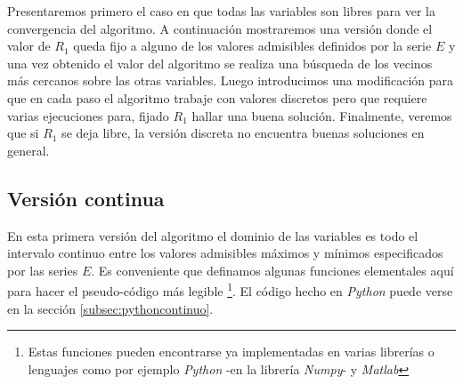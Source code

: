 \documentclass{llncs}
\begin{document}
	Presentaremos primero el caso en que todas las variables son libres para ver la convergencia del algoritmo. 
	A continuación mostraremos una versión donde el valor de $R_1$ queda fijo a alguno de los valores admisibles
	definidos por la serie $E$ y una vez obtenido el valor del algoritmo se realiza una búsqueda de los vecinos más cercanos
	sobre las otras variables.
	Luego introducimos una modificación para que en cada paso el algoritmo trabaje con valores discretos pero que requiere
	varias ejecuciones para, fijado $R_1$ hallar una buena solución. Finalmente, veremos que si $R_1$ se deja libre, la versión discreta
	no encuentra buenas soluciones en general.
	
	\subsection{Versión continua}
	\label{subsec:VersionContinua}
	En esta primera versión del algoritmo el dominio de las variables es todo el intervalo continuo entre los valores
	admisibles máximos y mínimos especificados por las series $E$. Es conveniente que definamos algunas funciones
	elementales aquí para hacer el pseudo-código más legible \footnote{Estas funciones pueden encontrarse ya implementadas en
	varias librerías o lenguajes como por ejemplo \textit{Python} -en la librería \textit{Numpy}- y \textit{Matlab}}. 
	El código hecho en \textit{Python} puede verse en la sección
	\ref{subsec:pythoncontinuo}.
	
\end{document}

